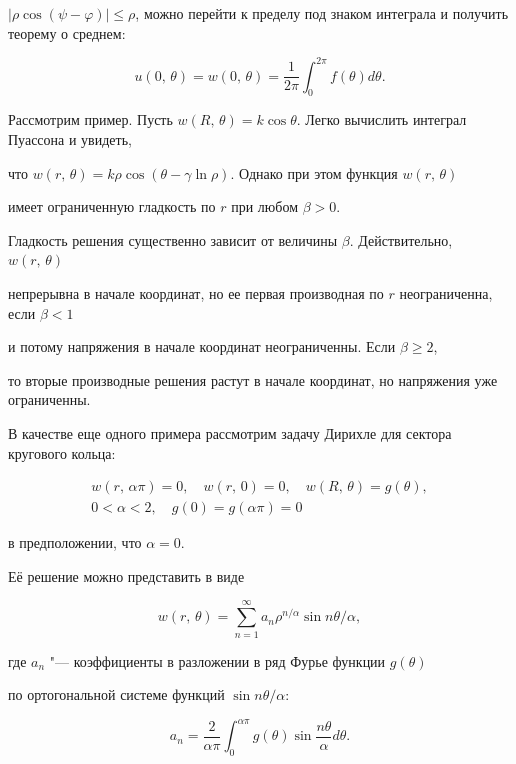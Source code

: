 $ \vert \rho \cos (\psi-\varphi)\vert \leq \rho$, можно перейти к пределу под знаком интеграла и получить теорему о среднем:

\[

u(0,\,\theta)= w(0,\,\theta)=\dfrac{1}{2 \pi} \int_0^{2 \pi}f(\theta)d \theta.

\]



Рассмотрим  пример. Пусть $ w(R,\,\theta)= k \cos \theta $. Легко вычислить интеграл Пуассона и увидеть,

что $ w(r,\,\theta)= k \rho \cos (\theta -\gamma \ln \rho) $. Однако при этом функция $ w(r,\,\theta) $

имеет ограниченную гладкость по $r$ при любом $\beta > 0$.

Гладкость решения существенно зависит от величины $\beta $. Действительно, $ w(r,\,\theta)$

непрерывна в начале координат, но ее первая производная по $ r $ неограниченна, если $ \beta < 1 $

и потому напряжения в начале координат неограниченны. Если  $\beta \geqslant 2 $,

то вторые производные решения растут в начале координат, но напряжения уже ограниченны.



В качестве еще одного примера  рассмотрим задачу Дирихле для сектора кругового кольца:

\begin{gather*}

 w(r,\,\alpha \pi)=0, \quad w(r,\,0)=0, \quad w(R,\,\theta)=g(\theta),\\

0<\alpha<2, \quad  g(0)=g(\alpha \pi)=0

\end{gather*}

в предположении, что $ \alpha =0 $.

Её решение можно представить в виде 

\[

w(r,\,\theta)=\sum_{n=1}^{\infty} a_n

\rho ^{n/\alpha}

\sin {n\theta}/{\alpha},

\]

где $a_n$ "--- коэффициенты в разложении в ряд Фурье функции $g(\theta)$

по ортогональной системе функций $\sin{n\theta}/{\alpha}$:

\[

a_n=\frac{2}{\alpha \pi}\int_0^{\alpha \pi} g(\theta)\sin \frac{n

\theta}{\alpha}d\theta.

\]

